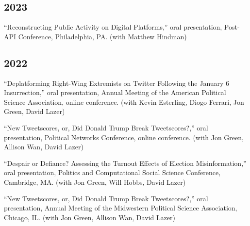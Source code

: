 \documentclass[11pt, letter]{article}
\begin{document}
\subsection{2023}

\begin{hangparas}{.25in}{1}
``Reconstructing Public Activity on Digital Platforms,'' oral presentation, Post-API Conference, Philadelphia, PA. (with Matthew Hindman)
\vspace{2mm}
\end{hangparas}

\subsection{2022}
\begin{hangparas}{.25in}{1}
``Deplatforming Right-Wing Extremists on Twitter Following the January 6 Insurrection,'' oral presentation, Annual Meeting of the American Political Science Association, online conference. (with Kevin Esterling, Diogo Ferrari, Jon Green, David Lazer)
\vspace{2mm}

``New Tweetscores, or, Did Donald Trump Break Tweetscores?,'' oral presentation, Political Networks Conference, online conference. (with Jon Green, Allison Wan, David Lazer)
\vspace{2mm}

``Despair or Defiance? Assessing the Turnout Effects of Election Misinformation,'' oral presentation, Politics and Computational Social Science Conference, Cambridge, MA. (with Jon Green, Will Hobbs, David Lazer)
\vspace{2mm}

``New Tweetscores, or, Did Donald Trump Break Tweetscores?,'' oral presentation, Annual Meeting of the Midwestern Political Science Association, Chicago, IL. (with Jon Green, Allison Wan, David Lazer)
\vspace{2mm}
\end{hangparas}
\end{document}

